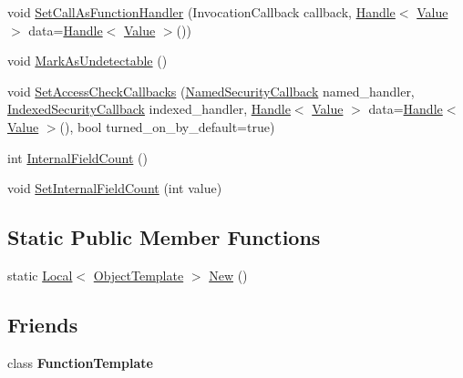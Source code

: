 \begin{DoxyCompactItemize}
\item 
void \hyperlink{classv8_1_1_object_template_a0132c34bbb52a69d13c54bf325effe6e}{Set\+Call\+As\+Function\+Handler} (Invocation\+Callback callback, \hyperlink{classv8_1_1_handle}{Handle}$<$ \hyperlink{classv8_1_1_value}{Value} $>$ data=\hyperlink{classv8_1_1_handle}{Handle}$<$ \hyperlink{classv8_1_1_value}{Value} $>$())
\item 
void \hyperlink{classv8_1_1_object_template_a7e40ef313b44c2ad336c73051523b4f8}{Mark\+As\+Undetectable} ()
\item 
void \hyperlink{classv8_1_1_object_template_acd0c47ecc715fa1256dc95524a4e8608}{Set\+Access\+Check\+Callbacks} (\hyperlink{namespacev8_ab5cafda0c556bba990c660ce9c904e0d}{Named\+Security\+Callback} named\+\_\+handler, \hyperlink{namespacev8_aebbcc7837753e51112d944ad96520da1}{Indexed\+Security\+Callback} indexed\+\_\+handler, \hyperlink{classv8_1_1_handle}{Handle}$<$ \hyperlink{classv8_1_1_value}{Value} $>$ data=\hyperlink{classv8_1_1_handle}{Handle}$<$ \hyperlink{classv8_1_1_value}{Value} $>$(), bool turned\+\_\+on\+\_\+by\+\_\+default=true)
\item 
int \hyperlink{classv8_1_1_object_template_a43de785d594d8c01b18230b1aa79e31c}{Internal\+Field\+Count} ()
\item 
void \hyperlink{classv8_1_1_object_template_ab63916ac584a76bca8ba541f86ce9fce}{Set\+Internal\+Field\+Count} (int value)
\end{DoxyCompactItemize}
\subsection*{Static Public Member Functions}
\begin{DoxyCompactItemize}
\item 
static \hyperlink{classv8_1_1_local}{Local}$<$ \hyperlink{classv8_1_1_object_template}{Object\+Template} $>$ \hyperlink{classv8_1_1_object_template_a394801526a9e9eb6df349a0eb8dfa0d0}{New} ()
\end{DoxyCompactItemize}
\subsection*{Friends}
\begin{DoxyCompactItemize}
\item 
\hypertarget{classv8_1_1_object_template_a334168ad1a5f39cf17b818ca3356aacd}{}class {\bfseries Function\+Template}\label{classv8_1_1_object_template_a334168ad1a5f39cf17b818ca3356aacd}

\end{DoxyCompactItemize}


